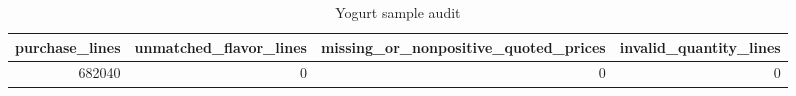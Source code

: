 \begin{table}
\caption{Yogurt sample audit}
\begin{tabular}{rrrr}
\toprule
purchase\_lines & unmatched\_flavor\_lines & missing\_or\_nonpositive\_quoted\_prices & invalid\_quantity\_lines \\
\midrule
682040 & 0 & 0 & 0 \\
\bottomrule
\end{tabular}
\end{table}
